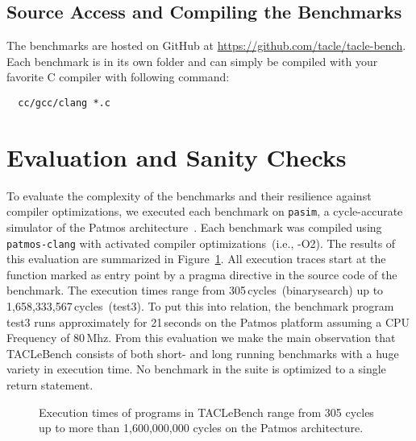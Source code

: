 \documentclass[a4paper,UKenglish]{oasics-v2016}
\begin{document}
\subsection{Source Access and Compiling the Benchmarks}

The benchmarks are hosted on GitHub at \url{https://github.com/tacle/tacle-bench}.
Each benchmark is in its own folder and can simply be compiled with your favorite
C compiler with following command:

\begin{verbatim}
  cc/gcc/clang *.c
\end{verbatim}


\section{Evaluation and Sanity Checks}
\label{sec:eval}
To evaluate the complexity of the benchmarks and their resilience against 
compiler optimizations, we executed each benchmark on \texttt{pasim}, a 
cycle-accurate simulator of the Patmos architecture~\cite{t-crest:2015}. Each 
benchmark was compiled using \texttt{patmos-clang} with activated compiler 
optimizations~(i.e., -O2). The results of this evaluation are summarized in 
Figure~\ref{fig:execution-times}. All execution traces start at the function 
marked as entry point by a pragma directive in the source code of the benchmark.
The execution times range from 305\,cycles~(binarysearch) up to 
1,658,333,567\,cycles~(test3).
To put this into relation, the benchmark program test3 runs approximately 
for 21\,seconds on the Patmos platform assuming a CPU Frequency of 80\,Mhz.
From this evaluation we make the main observation that 
TACLeBench consists of both short- and long running benchmarks with a huge variety in execution time. 
No benchmark in the suite is optimized to a single return statement.

\begin{figure}[t]
  \def\resultfile{eval/wcet.csv}
  
  \caption{Execution times of programs in TACLeBench range from 305 cycles up to more than 1,600,000,000 cycles on the Patmos architecture.}
  \label{fig:execution-times}
\end{figure}
\end{document}
